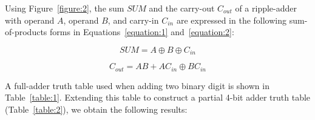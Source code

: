 \documentclass[12pt]{article}
\begin{document}
\newpage

Using Figure~\ref{figure:2}, the sum $SUM$ and the carry-out $C_{out}$ of a ripple-adder with operand $A$, operand $B$, and carry-in $C_{in}$ are expressed in the following sum-of-products forms in Equations~\ref{equation:1} and~\ref{equation:2}:

\begin{equation} \label{equation:1}
  SUM = A \oplus B \oplus C_{in}
\end{equation}

\begin{equation} \label{equation:2}
  C_{out} = AB + AC_{in} \oplus BC_{in}
\end{equation}

A full-adder truth table used when adding two binary digit is shown in Table~\ref{table:1}. Extending this table to construct a partial 4-bit adder truth table (Table~\ref{table:2}), we obtain the following results:
\end{document}
